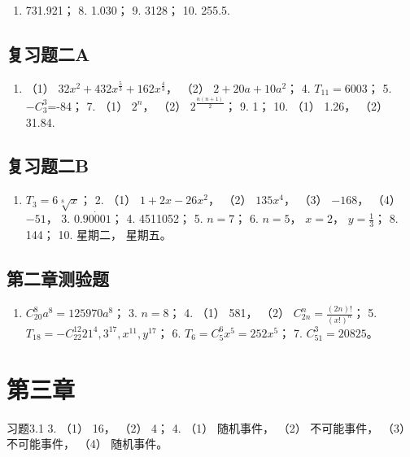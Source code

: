 \begin{enumerate}[start=7]
\item
  731.921； 8. 1.030； 9. 3128； 10. 255.5.
\end{enumerate}

\subsection{复习题二A}

\begin{enumerate}[start=2]
\item
  （1） \(32x^{2} + 432x^{\frac{5}{3}} + 162x^{\frac{4}{3}}\)， （2）
  \(2 + 20a + 10a^{2}\)； 4. \(T_{11} = 6003\)； 5. \(-C_{3}^{3}\)=-84；
  7. （1） \(2^{n}\)， （2） \(2^{\frac{n(n+1)}{2}}\)； 9. 1； 10. （1）
  1.26， （2） 31.84.
\end{enumerate}

\subsection{复习题二B}

\begin{enumerate}
\item
  \(T_{3} = 6\sqrt[8]{x}\)； 2. （1） \(1 + 2x - 26x^{2}\)， （2）
  \(135x^{4}\)， （3） \(-168\)， （4） \(-51\)， 3.
  \(0.90 \dot{0} 01\)； 4. 4511052； 5. \(n = 7\)； 6. \(n = 5\)，
  \(x = 2\)， \(y = \frac{1}{3}\)； 8. 144； 10. 星期二， 星期五。
\end{enumerate}

\subsection{第二章测验题}

\begin{enumerate}[start=2]
\item
  \(C_{20}^{8}a^{8} = 125970a^{8}\)； 3. \(n = 8\)； 4. （1） 581，
  （2） \(C_{2n}^{n} = \frac{(2n)!}{(x!)^{n}}\)； 5.
  \(T_{18} = -C_{22}^{12}21^{4}, 3^{17}, x^{11}, y^{17}\)； 6.
  \(T_{6} = C_{5}^{6} x^{5} = 252x^{5}\)； 7. \(C_{51}^{3} = 20825\)。
\end{enumerate}

\section{第三章}

习题3.1 3. （1） 16， （2） 4； 4. （1） 随机事件， （2） 不可能事件，
（3） 不可能事件， （4） 随机事件。

